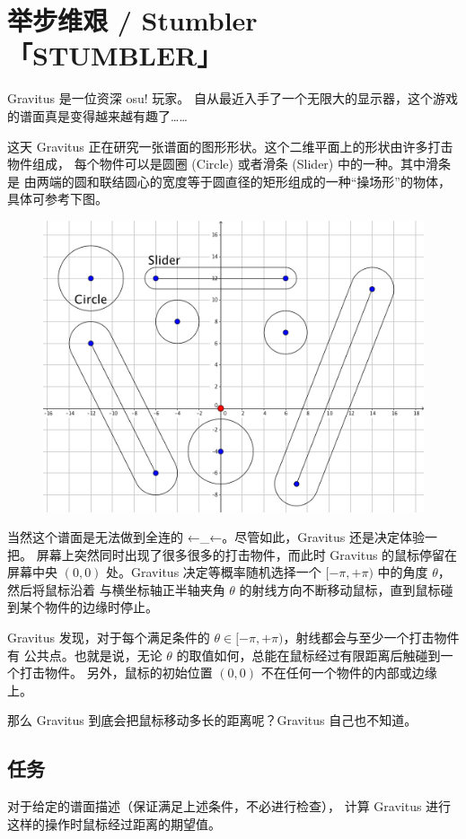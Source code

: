 \documentclass[UTF8, 11pt, a4paper]{article}
\begin{document}
\section*{举步维艰 / Stumbler \makebox[2.5em]{} \small{「STUMBLER」}}
Gravitus 是一位资深 osu! 玩家。%
自从最近入手了一个无限大的显示器，这个游戏的谱面真是变得越来越有趣了……

这天 Gravitus 正在研究一张谱面的图形形状。这个二维平面上的形状由许多打击物件组成，%
每个物件可以是圆圈 (Circle) 或者滑条 (Slider) 中的一种。其中滑条是%
由两端的圆和联结圆心的宽度等于圆直径的矩形组成的一种“操场形”的物体，具体可参考下图。

\begin{figure}[h]\centering
\includegraphics[scale=0.2]{desc.png}
\end{figure}

当然这个谱面是无法做到全连的 ←\_←。尽管如此，Gravitus 还是决定体验一把。%
屏幕上突然同时出现了很多很多的打击物件，而此时 Gravitus 的鼠标停留在屏幕中央 $(0, 0)$ %
处。Gravitus 决定等概率随机选择一个 $[-\pi, +\pi)$ 中的角度 $\theta$，然后将鼠标沿着%
与横坐标轴正半轴夹角 $\theta$ 的射线方向不断移动鼠标，直到鼠标碰到某个物件的边缘时停止。

Gravitus 发现，对于每个满足条件的 $\theta \in [-\pi, +\pi)$，射线都会与至少一个打击物件有%
公共点。也就是说，无论 $\theta$ 的取值如何，总能在鼠标经过有限距离后触碰到一个打击物件。%
另外，鼠标的初始位置 $(0, 0)$ 不在任何一个物件的内部或边缘上。

那么 Gravitus 到底会把鼠标移动多长的距离呢？Gravitus 自己也不知道。

\subsection*{任务}
对于给定的谱面描述（保证满足上述条件，不必进行检查），%
计算 Gravitus 进行这样的操作时鼠标经过距离的期望值。
\end{document}
